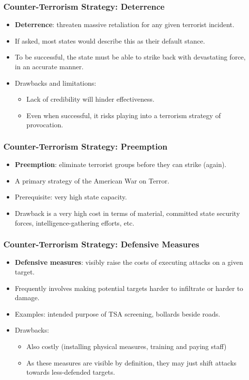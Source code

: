 \documentclass{beamer}
\begin{document}
\begin{frame} 
\frametitle{\LARGE{Counter-Terrorism Strategy: Deterrence}}
\begin{itemize}
		\item \textbf{Deterrence}: threaten massive retaliation for any given terrorist incident. \pause
		\item If asked, most states would describe this as their default stance. \pause
		\item To be successful, the state must be able to strike back with devastating force, in an accurate manner.
		\item Drawbacks and limitations: \pause
		\begin{itemize}
			\item Lack of credibility will hinder effectiveness. \pause
			\item Even when successful, it risks playing into a terrorism strategy of provocation.
		\end{itemize}
\end{itemize}
\end{frame}

\begin{frame} 
	\frametitle{\LARGE{Counter-Terrorism Strategy: Preemption}}
	\begin{itemize}
		\item \textbf{Preemption}: eliminate terrorist groups before they can strike (again). \pause 
		\item A primary strategy of the American War on Terror.
		\item Prerequisite: very high state capacity. \pause
		\item Drawback is a very high cost in terms of material, committed state security forces, intelligence-gathering efforts, etc.  
	\end{itemize}
\end{frame}

\begin{frame} 
	\frametitle{\LARGE{Counter-Terrorism Strategy: Defensive Measures}}
	\begin{itemize} 
		\item \textbf{Defensive measures}: visibly raise the costs of executing attacks on a given target. \pause
		\item Frequently involves making potential targets harder to infiltrate or harder to damage.
		\item Examples: intended purpose of TSA screening, bollards beside roads.
		\item Drawbacks:
		\begin{itemize}
			\item Also costly (installing physical measures, training and paying staff) \pause
			\item As these measures are visible by definition, they may just shift attacks towards less-defended targets. 
		\end{itemize}
	\end{itemize}
\end{frame}
\end{document}
